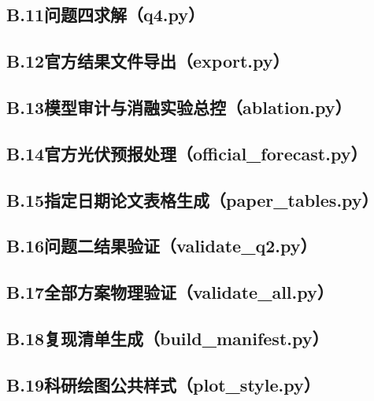 \subsection*{B.11\quad 问题四求解（q4.py）}


\subsection*{B.12\quad 官方结果文件导出（export.py）}


\subsection*{B.13\quad 模型审计与消融实验总控（ablation.py）}


\subsection*{B.14\quad 官方光伏预报处理（official\_forecast.py）}


\subsection*{B.15\quad 指定日期论文表格生成（paper\_tables.py）}


\subsection*{B.16\quad 问题二结果验证（validate\_q2.py）}


\subsection*{B.17\quad 全部方案物理验证（validate\_all.py）}


\subsection*{B.18\quad 复现清单生成（build\_manifest.py）}


\subsection*{B.19\quad 科研绘图公共样式（plot\_style.py）}


